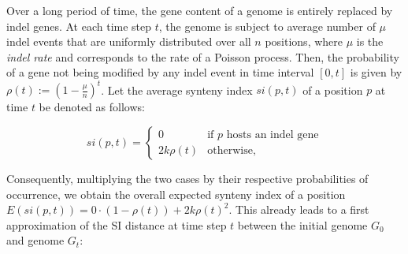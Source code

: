 \documentclass[9pt,english,utf8]{article}
\begin{document}
\begin{center}
\end{center}


\noindent Over a long period of time, the gene content of a genome is entirely
replaced by indel genes. At each time step $t$, the genome is subject to
average number of $\mu$ indel events that are uniformly distributed over all
$n$ positions, where $\mu$ is the \emph{indel rate} and corresponds to the rate
of a Poisson process. Then, the probability of a gene not being modified by any
indel event in time interval $[0, t]$ is given by $\rho(t) :=
(1-\frac{\mu}{n})^t$.  Let the average synteny index $\mathit{si}(p, t)$ of a
position $p$ at time $t$ be denoted as follows:

\begin{equation}
    \mathit{si}(p,t) = \begin{cases} 0 & \textrm{if $p$ hosts an indel gene}\\
        2k\rho(t) & \textrm{otherwise,} \end{cases}
\end{equation}

\noindent Consequently, multiplying the two cases by their respective
probabilities of occurrence, we obtain the overall expected synteny index of a
position $E(si(p,t)) = 0 \cdot (1-\rho(t)) + 2k\rho(t)^2$.  This already leads
to a first approximation of the SI distance at time step $t$ between the initial
genome $G_0$ and genome $G_t$:
\end{document}
